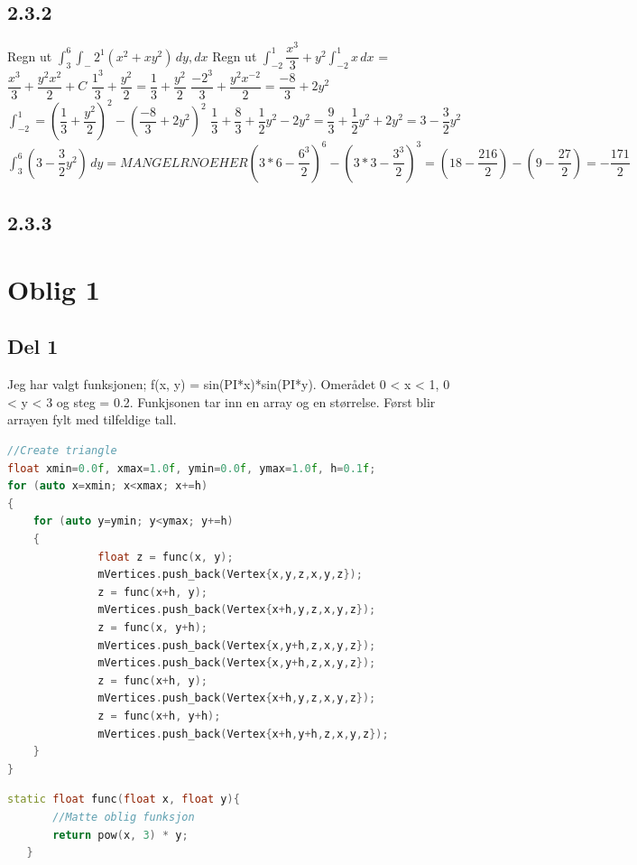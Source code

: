 \documentclass[a4paper,norsk]{article}
\begin{document}
\subsection{2.3.2}
Regn ut \(\int_3^6 \int_-2^1 (x^2 + xy^2) \,dy, dx\) \newline
Regn ut \(\int_{-2}^{1} \dfrac{x^3}{3} +y^2 \int_{-2}^{1} x \,dx\) = \( \dfrac{x^3}{3} + \dfrac{y^2x^2}{2} + C\)\newline
\( \dfrac{1^3}{3} + \dfrac{y^2}{2}  = \dfrac{1}{3} + \dfrac{y^2}{2}\) \newline
\( \dfrac{-2^3}{3} + \dfrac{y^2x^{-2}}{2}  = \dfrac{-8}{3} + 2y^2\) \newline
\(\int_{-2}^{1} = (\dfrac{1}{3} + \dfrac{y^2}{2})^2- (\dfrac{-8}{3} + 2y^2)^2\)\newline
\(\dfrac{1}{3} + \dfrac{8}{3} +\dfrac{1}{2} y^2 - 2y^2 =  \dfrac{9}{3} + \dfrac{1}{2}y^2+2y^2 = 3 - \dfrac{3}{2}y^2 \)\newline
 \(\int_3^6  (3 - \dfrac{3}{2}y^2 ) \,dy = MANGELR NOE HER (3*6 - \dfrac{6^3}{2})^6 - (3*3 - \dfrac{3^3}{2})^3 = (18 - \dfrac{216}{2}) - (9 - \dfrac{27}{2}) = -\dfrac{171}{2}\)

\subsection{2.3.3}


\section{Oblig 1}
\subsection{Del 1}
Jeg har valgt funksjonen; f(x, y) = sin(PI*x)*sin(PI*y). Omerådet 0 < x < 1, 0 < y < 3 og steg = 0.2.
Funkjsonen tar inn en array og en størrelse. Først blir arrayen fylt med tilfeldige tall. 
\begin{lstlisting}[language=C++, caption={trianglesurface.cpp}]
//Create triangle
float xmin=0.0f, xmax=1.0f, ymin=0.0f, ymax=1.0f, h=0.1f;
for (auto x=xmin; x<xmax; x+=h)
{
	for (auto y=ymin; y<ymax; y+=h)
	{
              float z = func(x, y); 
              mVertices.push_back(Vertex{x,y,z,x,y,z});
              z = func(x+h, y);
              mVertices.push_back(Vertex{x+h,y,z,x,y,z});
              z = func(x, y+h);
              mVertices.push_back(Vertex{x,y+h,z,x,y,z});
              mVertices.push_back(Vertex{x,y+h,z,x,y,z});
              z = func(x+h, y);
              mVertices.push_back(Vertex{x+h,y,z,x,y,z});
              z = func(x+h, y+h);
              mVertices.push_back(Vertex{x+h,y+h,z,x,y,z});
	}
}
\end{lstlisting}
\begin{lstlisting}[language=C++, caption={trianglesurface.hh}]
static float func(float x, float y){
       //Matte oblig funksjon
       return pow(x, 3) * y;
   }
\end{lstlisting}
\end{document}
